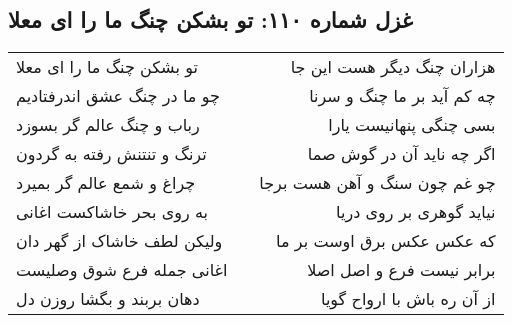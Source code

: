 \begin{center}
\section*{غزل شماره ۱۱۰: تو بشکن چنگ ما را ای معلا}
\label{sec:0110}
\begin{longtable}{l p{0.5cm} r}
تو بشکن چنگ ما را ای معلا
&&
هزاران چنگ دیگر هست این جا
\\
چو ما در چنگ عشق اندرفتادیم
&&
چه کم آید بر ما چنگ و سرنا
\\
رباب و چنگ عالم گر بسوزد
&&
بسی چنگی پنهانیست یارا
\\
ترنگ و تنتنش رفته به گردون
&&
اگر چه ناید آن در گوش صما
\\
چراغ و شمع عالم گر بمیرد
&&
چو غم چون سنگ و آهن هست برجا
\\
به روی بحر خاشاکست اغانی
&&
نیاید گوهری بر روی دریا
\\
ولیکن لطف خاشاک از گهر دان
&&
که عکس عکس برق اوست بر ما
\\
اغانی جمله فرع شوق وصلیست
&&
برابر نیست فرع و اصل اصلا
\\
دهان بربند و بگشا روزن دل
&&
از آن ره باش با ارواح گویا
\\
\end{longtable}
\end{center}
